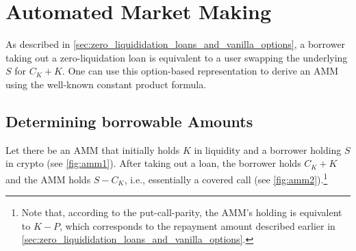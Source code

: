 \documentclass[a4paper]{article}
\begin{document}

\section{Automated Market Making}
\label{sec:AMM}
As described in \cref{sec:zero_liquididation_loans_and_vanilla_options}, a borrower taking out a zero-liquidation loan is equivalent to a user swapping the underlying $S$ for $C_K+K$. One can use this option-based representation to derive an AMM using the well-known constant product formula.\\

\subsection{Determining borrowable Amounts}
Let there be an AMM that initially holds $K$ in liquidity and a borrower holding $S$ in crypto (see \cref{fig:amm1}). After taking out a loan, the borrower holds $C_K+K$ and the AMM holds $S-C_K$, i.e., essentially a covered call (see \cref{fig:amm2}).\footnote{Note that, according to the put-call-parity, the AMM's holding is equivalent to $K-P$, which corresponds to the repayment amount described earlier in \cref{sec:zero_liquididation_loans_and_vanilla_options}.}
\end{document}
